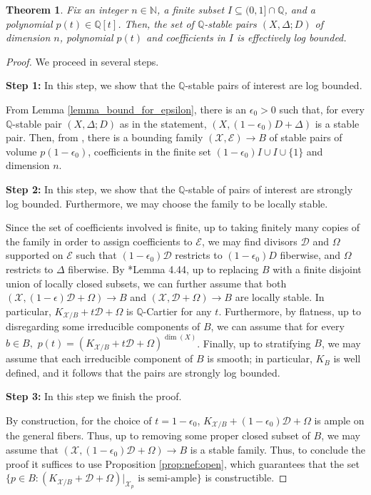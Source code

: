\documentclass{amsart}
\newcommand{\bQ}{\mathbb{Q}}
\newcommand{\cD}{\mathcal{D}}
\newcommand{\cX}{\mathcal{X}}
\newtheorem{theorem}{Theorem}[section]
\theoremstyle{definition}
\begin{document}
\begin{theorem}\label{thm_boundedness}
Fix an integer $n\in \mathbb{N}$, a finite subset $I\subseteq (0,1] \cap \mathbb{Q}$, and a polynomial $p(t) \in \mathbb{Q}[t]$.
Then, the set of $\bQ$-stable pairs $(X,\Delta;D)$ of dimension $n$, polynomial $p(t)$ and coefficients in $I$ is effectively log bounded.
\end{theorem}
\begin{proof}
We proceed in several steps.

{\bf Step 1:} In this step, we show that the $\bQ$-stable pairs of interest are log bounded.

From Lemma \ref{lemma_bound_for_epsilon}, there is an $\epsilon_0>0$ such that, for every $\bQ$-stable pair $(X,\Delta;D)$ as in the statement, $(X,(1-\epsilon_0)D + \Delta)$ is a stable pair.
Then, from \cite{HMX}, there is a bounding family $(\cX,\mathcal{E})\to B$ of stable pairs of volume $p(1-\epsilon_0)$, coefficients in the finite set $(1-\epsilon_0)I\cup I \cup \{1\}$ and dimension $n$.

{\bf Step 2:} In this step, we show that the $\bQ$-stable of pairs of interest are strongly log bounded.
Furthermore, we may choose the family to be locally stable.

Since the set of coefficients involved is finite, up to taking finitely many copies of the family in order to assign coefficients to $\mathcal{E}$, we may find divisors $\mathcal{D}$ and $\Omega$ supported on $\mathcal{E}$ such that $(1-\epsilon_0)\mathcal{D}$ restricts to $(1-\epsilon_0)D$ fiberwise, and $\Omega$ restricts to $\Delta$ fiberwise.
By \cite{kol_new}*{Lemma 4.44}, up to replacing $B$ with a finite disjoint union of locally closed subsets, we can further assume that both $(\cX,(1-\epsilon)\cD + \Omega)\to B$ and
$(\cX,\cD + \Omega)\to B$ are locally stable.
In particular, $K_{\cX/B} + t\cD + \Omega$ is $\mathbb{Q}$-Cartier for any $t$.
Furthermore, by flatness, up to disregarding some irreducible components of $B$, we can assume that for every $b\in B,$ $p(t) = (K_{\cX/B} + t\cD + \Omega)^{\dim(X)}$.
Finally, up to stratifying $B$, we may assume that each irreducible component of $B$ is smooth;
in particular, $K_B$ is well defined, and it follows that the pairs are strongly log bounded. 

{\bf Step 3:} In this step we finish the proof.

By construction, for the choice of $t = 1-\epsilon_0$, $K_{\cX/B} + (1-\epsilon_0)\cD + \Omega$ is ample on the general fibers.
Thus, up to removing some proper closed subset of $B$, we may assume that $(\cX,(1-\epsilon_0)\cD + \Omega)\to B$ is a stable family.
Thus, to conclude the proof it suffices to use Proposition \ref{prop:nef:open}, which guarantees that the set $
\{p \in B  \colon  (K_{\cX/B} + \cD + \Omega)|_{{\cX}_p}\text{ is semi-ample}\}$ is constructible.
\end{proof}
\end{document}
